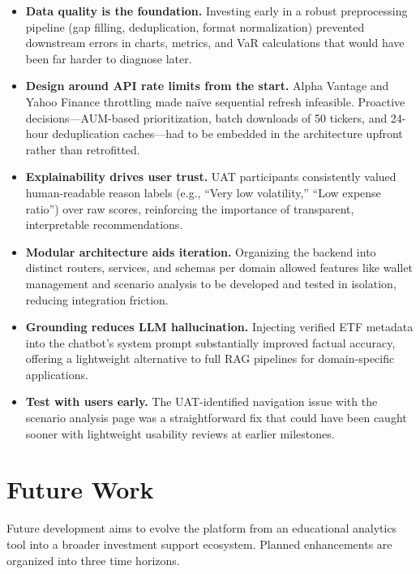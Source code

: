 \begin{itemize}
    \item \textbf{Data quality is the foundation.} Investing early in a robust preprocessing pipeline (gap filling, deduplication, format normalization) prevented downstream errors in charts, metrics, and VaR calculations that would have been far harder to diagnose later.
    \item \textbf{Design around API rate limits from the start.} Alpha Vantage and Yahoo Finance throttling made naïve sequential refresh infeasible. Proactive decisions---AUM-based prioritization, batch downloads of 50 tickers, and 24-hour deduplication caches---had to be embedded in the architecture upfront rather than retrofitted.
    \item \textbf{Explainability drives user trust.} UAT participants consistently valued human-readable reason labels (e.g., ``Very low volatility,'' ``Low expense ratio'') over raw scores, reinforcing the importance of transparent, interpretable recommendations.
    \item \textbf{Modular architecture aids iteration.} Organizing the backend into distinct routers, services, and schemas per domain allowed features like wallet management and scenario analysis to be developed and tested in isolation, reducing integration friction.
    \item \textbf{Grounding reduces LLM hallucination.} Injecting verified ETF metadata into the chatbot's system prompt substantially improved factual accuracy, offering a lightweight alternative to full RAG pipelines for domain-specific applications.
    \item \textbf{Test with users early.} The UAT-identified navigation issue with the scenario analysis page was a straightforward fix that could have been caught sooner with lightweight usability reviews at earlier milestones.
\end{itemize}

\section{Future Work}

Future development aims to evolve the platform from an educational analytics tool into a broader investment support ecosystem. Planned enhancements are organized into three time horizons.

